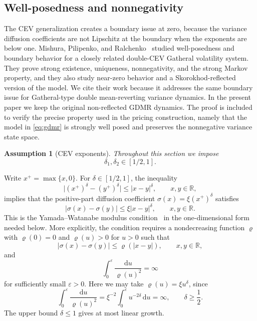 \documentclass[pdflatex,sn-mathphys-num]{sn-jnl}
\theoremstyle{thmstyleone}%
\theoremstyle{thmstylethree}%
\newtheorem{assumption}[theorem]{Assumption}
\theoremstyle{thmstyletwo}%
\newcommand{\dd}{\mathrm d}
\newcommand{\R}{\mathbb R}
\begin{document}

\subsection{Well-posedness and nonnegativity}\label{sec:wellposed}

The CEV generalization creates a boundary issue at zero, because the variance
diffusion coefficients are not Lipschitz at the boundary when the exponents are
below one. Mishura, Pilipenko, and Ralchenko~\cite{mishura2025gatheral}
studied well-posedness and boundary behavior for a closely related double-CEV
Gatheral volatility system. They prove strong existence, uniqueness,
nonnegativity, and the strong Markov property, and they also study near-zero
behavior and a Skorokhod-reflected version of the model. We cite their work
because it addresses the same boundary issue for Gatheral-type double
mean-reverting variance dynamics. In the present paper we keep the original
non-reflected GDMR dynamics. The proof is included to verify the precise
property used in the pricing construction, namely that the model in
\eqref{eq:gdmr} is strongly well posed and preserves the nonnegative variance
state space.

\begin{assumption}[CEV exponents]\label{ass:delta-range}
Throughout this section we impose
$$
\delta_1,\delta_2\in[1/2,1].
$$
\end{assumption}

Write $x^+=\max\{x,0\}$. For $\delta\in[1/2,1]$, the inequality
$$
\bigl|(x^+)^\delta-(y^+)^\delta\bigr|
\le |x-y|^\delta,\qquad x,y\in\R,
$$
implies that the positive-part diffusion coefficient
$\sigma(x)=\xi(x^+)^\delta$ satisfies
$$
|\sigma(x)-\sigma(y)|
\le \xi |x-y|^\delta,\qquad x,y\in\R.
$$
This is the Yamada--Watanabe modulus condition~\cite{yamada1971uniqueness} in
the one-dimensional form needed below. More explicitly, the condition requires a
nondecreasing function $\varrho$ with $\varrho(0)=0$ and $\varrho(u)>0$ for
$u>0$ such that
$$
|\sigma(x)-\sigma(y)|\le \varrho(|x-y|),\qquad x,y\in\R,
$$
and
$$
\int_0^\varepsilon \frac{\dd u}{\varrho(u)^2}
=
\infty
$$
for sufficiently small $\varepsilon>0$. Here we may take
$\varrho(u)=\xi u^\delta$, since
$$
\int_0^\varepsilon \frac{\dd u}{\varrho(u)^2}
=
\xi^{-2}\int_0^\varepsilon u^{-2\delta}\,\dd u
=
\infty,\qquad \delta\ge\frac12.
$$
The upper bound $\delta\le1$ gives at most linear growth.
\end{document}
